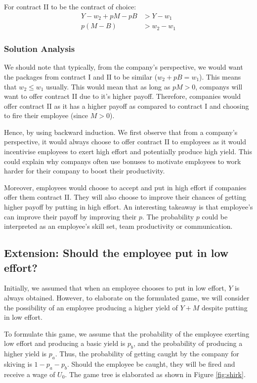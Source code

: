 \documentclass[a4paper, 12pt]{article}
\begin{document}
For contract II to be the contract of choice:
\begin{align*}
    Y-w_2 + pM - pB &> Y - w_1 \\
    p(M - B) &> w_2 - w_1
\end{align*}

\subsubsection{Solution Analysis}

We should note that typically, from the company's perspective, we would want the packages from contract I and II to be similar ($w_2 + pB = w_1$). This means that $w_2 \leq w_1$ usually. This would mean that as long as $pM > 0$, companys will want to offer contract II due to it's higher payoff. Therefore, companies would offer contract II as it has a higher payoff as compared to contract I and choosing to fire their employee (since $M > 0$).

Hence, by using backward induction. We first observe that from a company's perspective, it would always choose to offer contract II to employees as it would incentivise employees to exert high effort and potentially produce high yield. This could explain why companys often use bonuses to motivate employees to work harder for their company to boost their productivity. 

Moreover, employees would choose to accept and put in high effort if companies offer them contract II. They will also choose to improve their chances of getting higher payoff by putting in high effort. An interesting takeaway is that employee's can improve their payoff by improving their $p$. The probability $p$ could be interpreted as an employee's skill set, team productivity or communication. 

\subsection{Extension: Should the employee put in low effort?}

Initially, we assumed that when an employee chooses to put in low effort, $Y$ is always obtained. However, to elaborate on the formulated game, we will consider the possibility of an employee producing a higher yield of $Y+M$ despite putting in low effort. 

To formulate this game, we assume that the probability of the employee exerting low effort and producing a basic yield is $p_b$, and the probability of producing a higher yield is $p_a$. Thus, the probability of getting caught by the company for skiving is $1-p_a-p_b$. Should the employee be caught, they will be fired and receive a wage of $U_0$. The game tree is elaborated as shown in Figure \ref{fig:shirk}.
\end{document}
